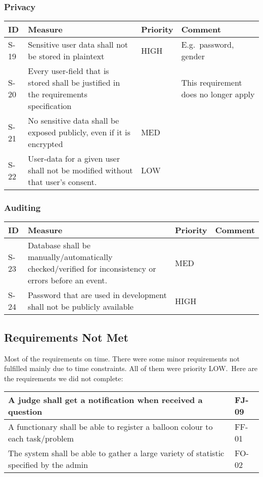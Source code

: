 \newpage
\subsubsection{Privacy}
\begin{supertabular}{|l|p{7cm}|l|p{5cm}|}
\hline
\textbf{ID} & \textbf{Measure} & \textbf{Priority} & \textbf{Comment} \\ 
\hline

S-19 & Sensitive user data shall not be stored in plaintext  & HIGH & E.g.\ password, gender \\ 
\hline

S-20 & Every user-field that is stored shall be justified in the requirements
specification & & This requirement does no longer apply \\ 
\hline

S-21 & No sensitive data shall be exposed publicly, even if it is encrypted&MED
& \\ 
\hline

S-22 & User-data for a given user shall not be modified without that user's
consent.  & LOW & \\ 
\hline
\end{supertabular}

\subsubsection{Auditing}
\begin{supertabular}{|l|p{7cm}|l|p{5cm}|}
\hline
\textbf{ID} & \textbf{Measure} & \textbf{Priority} & \textbf{Comment} \\ 
\hline

S-23 & Database shall be manually/automatically checked/verified for
inconsistency or errors before an event. & MED & \\
\hline

S-24 & Password that are used in development shall not be publicly available
& HIGH  &\\
\hline
\end{supertabular}

\subsection{Requirements Not Met}
Most of the requirements on time.
There were some minor requirements not fulfilled mainly due to time
constraints. All of them were priority LOW.\ Here are the requirements
we did not complete:

\begin{supertabular}{|m{5.0566597in}|m{1.2858598in}|}
\hline
A judge shall get a notification when received a question & FJ-09\\\hline
A functionary shall be able to register a balloon colour to each task/problem &
FF-01\\\hline
The system shall be able to gather a large variety of statistic specified by
the admin & FO-02\\\hline
\end{supertabular}

